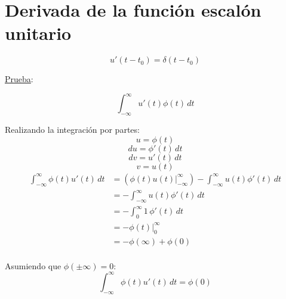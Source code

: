 \section{Derivada de la función escalón unitario}
\begin{figure}[H]
    \centering
    \begin{minipage}{.4\textwidth}
        \centering
        
    \end{minipage}
    \begin{minipage}{.4\textwidth}
        \centering
        
    \end{minipage}
\end{figure}
\begin{equation}
    u'(t-t_0)=\delta(t-t_0)
\end{equation}

\underline{Prueba}:

\begin{equation*}
    \int_{-\infty}^{\infty}u'(t)\phi(t)\,dt
\end{equation*}

Realizando la integración por partes:
\begin{equation*}
    u=\phi(t)
\end{equation*}
\begin{equation*}
    du=\phi'(t)\,dt
\end{equation*}
\begin{equation*}
    dv=u'(t)\,dt
\end{equation*}
\begin{equation*}
    v=u(t)
\end{equation*}
\begin{equation*}
\begin{split}
    \int_{-\infty}^{\infty}\phi(t)u'(t)\,dt
        &=(\phi(t)u(t)\Big|_{-\infty}^{\infty})
        -\int_{-\infty}^{\infty}u(t)\phi'(t)\,dt\\
        &=-\int_{-\infty}^{\infty}u(t)\phi'(t)\,dt\\
        &=-\int_{0}^{\infty}1\,\phi'(t)\,dt\\
        &=-\phi(t)\Big|_0^{\infty}\\
        &=-\phi(\infty)+\phi(0)\\
\end{split}
\end{equation*}

Asumiendo que $\phi(\pm\infty)=0$:
\begin{equation*}
    \int_{-\infty}^{\infty}\phi(t)u'(t)\,dt=\phi(0)
\end{equation*}

